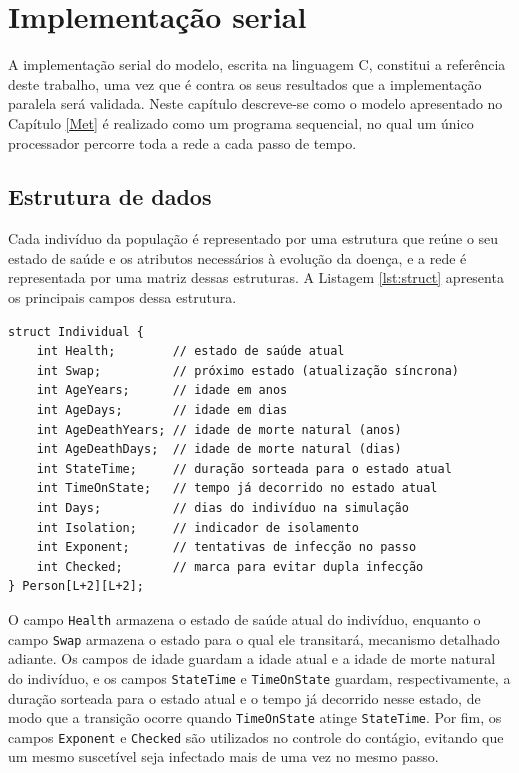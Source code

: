 \chapter{Implementação serial}
\label{cap:serial}

A implementação serial do modelo, escrita na linguagem C, constitui a referência deste trabalho, uma vez que é contra os seus resultados que a implementação paralela será validada. Neste capítulo descreve-se como o modelo apresentado no Capítulo \ref{Met} é realizado como um programa sequencial, no qual um único processador percorre toda a rede a cada passo de tempo.

\section{Estrutura de dados}

Cada indivíduo da população é representado por uma estrutura que reúne o seu estado de saúde e os atributos necessários à evolução da doença, e a rede é representada por uma matriz dessas estruturas. A Listagem \ref{lst:struct} apresenta os principais campos dessa estrutura.

\begin{lstlisting}[caption={Estrutura que representa cada indivíduo (agente).}, label={lst:struct}]
struct Individual {
    int Health;        // estado de saúde atual
    int Swap;          // próximo estado (atualização síncrona)
    int AgeYears;      // idade em anos
    int AgeDays;       // idade em dias
    int AgeDeathYears; // idade de morte natural (anos)
    int AgeDeathDays;  // idade de morte natural (dias)
    int StateTime;     // duração sorteada para o estado atual
    int TimeOnState;   // tempo já decorrido no estado atual
    int Days;          // dias do indivíduo na simulação
    int Isolation;     // indicador de isolamento
    int Exponent;      // tentativas de infecção no passo
    int Checked;       // marca para evitar dupla infecção
} Person[L+2][L+2];
\end{lstlisting}

O campo \texttt{Health} armazena o estado de saúde atual do indivíduo, enquanto o campo \texttt{Swap} armazena o estado para o qual ele transitará, mecanismo detalhado adiante. Os campos de idade guardam a idade atual e a idade de morte natural do indivíduo, e os campos \texttt{StateTime} e \texttt{TimeOnState} guardam, respectivamente, a duração sorteada para o estado atual e o tempo já decorrido nesse estado, de modo que a transição ocorre quando \texttt{TimeOnState} atinge \texttt{StateTime}. Por fim, os campos \texttt{Exponent} e \texttt{Checked} são utilizados no controle do contágio, evitando que um mesmo suscetível seja infectado mais de uma vez no mesmo passo.

